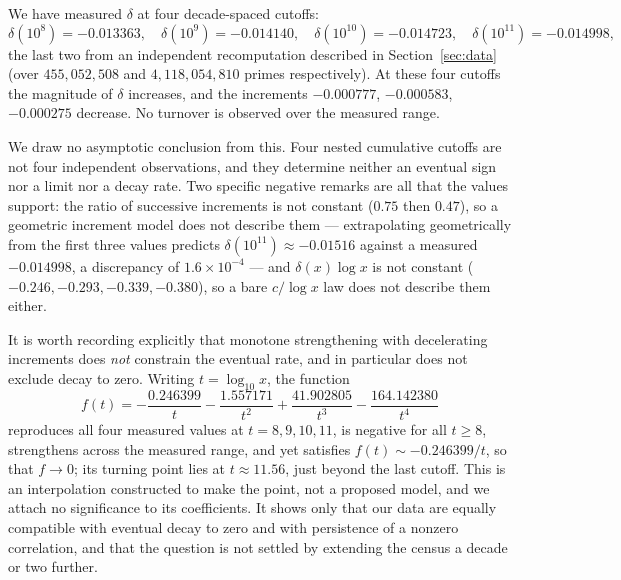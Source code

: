 \documentclass[11pt,reqno]{amsart}
\theoremstyle{plain}
\theoremstyle{definition}
\begin{document}
We have measured $\delta$ at four decade-spaced cutoffs:
\[
  \delta(10^8) = -0.013363, \quad
  \delta(10^9) = -0.014140, \quad
  \delta(10^{10}) = -0.014723, \quad
  \delta(10^{11}) = -0.014998 ,
\]
the last two from an independent recomputation described in
Section~\ref{sec:data} (over $455{,}052{,}508$ and $4{,}118{,}054{,}810$
primes respectively). At these four cutoffs the magnitude of $\delta$
increases, and the increments $-0.000777$, $-0.000583$, $-0.000275$ decrease.
No turnover is observed over the measured range.

We draw no asymptotic conclusion from this. Four nested cumulative cutoffs are
not four independent observations, and they determine neither an eventual sign
nor a limit nor a decay rate. Two specific negative remarks are all that the
values support: the ratio of successive increments is not constant ($0.75$
then $0.47$), so a geometric increment model does not describe them ---
extrapolating geometrically from the first three values predicts
$\delta(10^{11}) \approx -0.01516$ against a measured $-0.014998$, a
discrepancy of $1.6 \times 10^{-4}$ --- and $\delta(x)\log x$ is not constant
($-0.246, -0.293, -0.339, -0.380$), so a bare $c/\log x$ law does not describe
them either.

It is worth recording explicitly that monotone strengthening with decelerating
increments does \emph{not} constrain the eventual rate, and in particular does
not exclude decay to zero. Writing $t = \log_{10} x$, the function
\[
  f(t) = -\frac{0.246399}{t} - \frac{1.557171}{t^2}
         + \frac{41.902805}{t^3} - \frac{164.142380}{t^4}
\]
reproduces all four measured values at $t = 8, 9, 10, 11$, is negative for all
$t \ge 8$, strengthens across the measured range, and yet satisfies
$f(t) \sim -0.246399/t$, so that $f \to 0$; its turning point lies at
$t \approx 11.56$, just beyond the last cutoff. This is an interpolation
constructed to make the point, not a proposed model, and we attach no
significance to its coefficients. It shows only that our data are equally
compatible with eventual decay to zero and with persistence of a nonzero
correlation, and that the question is not settled by extending the census a
decade or two further.
\end{document}
